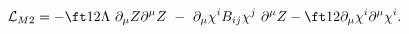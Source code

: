 \begin{equation}
\mathcal{L}_{M2} =-\ft12 \Lambda\  \partial_\mu Z \partial^\mu Z 
\ - \ \partial_\mu \chi^i B_{ij} \chi^j \ \partial^\mu Z
- \ft12 \partial_\mu \chi^i \partial^\mu \chi^i.
\label{M2twisted}
\end{equation}

